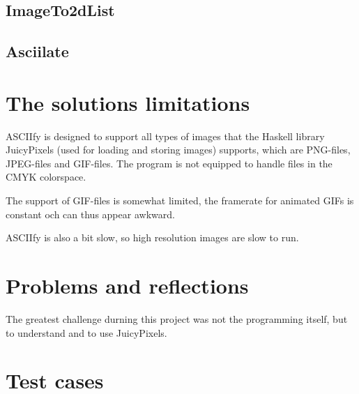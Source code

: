 \documentclass[12pt, a4paper]{article}
\begin{document}
		\subsection{ImageTo2dList}
			
		\subsection{Asciilate}	
	
	\section{The solutions limitations}
	
	ASCIIfy is designed to support all types of images that the Haskell library JuicyPixels (used for loading and storing images) supports, which are PNG-files, JPEG-files and GIF-files. The program is not equipped to handle files in the CMYK colorspace. 

	The support of GIF-files is somewhat limited, the framerate for animated GIFs is constant och can thus appear awkward. 

	ASCIIfy is also a bit slow, so high resolution images are slow to run.

		

	\section{Problems and reflections}
		
		The greatest challenge durning this project was not the programming itself, but to understand and to use JuicyPixels. 

		

	\section{Test cases}
		
		
		
\end{document}
